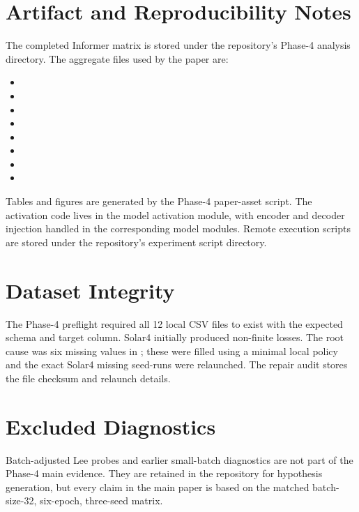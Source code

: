 \section{Artifact and Reproducibility Notes}

The completed Informer matrix is stored under the repository's Phase-4 analysis directory. The aggregate files used by the paper are:
\begin{itemize}
    \item {}
    \item {}
    \item {}
    \item {}
    \item {}
    \item {}
    \item {}
    \item {}
\end{itemize}

Tables and figures are generated by the Phase-4 paper-asset script. The activation code lives in the model activation module, with encoder and decoder injection handled in the corresponding model modules. Remote execution scripts are stored under the repository's experiment script directory.

\section{Dataset Integrity}

The Phase-4 preflight required all 12 local CSV files to exist with the expected schema and target column. Solar4 initially produced non-finite losses. The root cause was six missing values in ; these were filled using a minimal local policy and the exact Solar4 missing seed-runs were relaunched. The repair audit stores the file checksum and relaunch details.

\section{Excluded Diagnostics}

Batch-adjusted Lee probes and earlier small-batch diagnostics are not part of the Phase-4 main evidence. They are retained in the repository for hypothesis generation, but every claim in the main paper is based on the matched batch-size-32, six-epoch, three-seed matrix.

